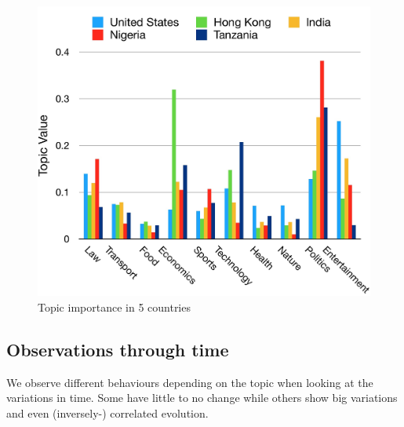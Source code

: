 \documentclass[11pt]{article}
\begin{document}
\begin{figure}[hbtp!]
    \centering
    \includegraphics[width=\linewidth]{images/5countries.jpg}
    \caption{Topic importance in 5 countries}
    \label{fig:5countries}
\end{figure}


\subsection{Observations through time}
We observe different behaviours depending on the topic when looking at the variations in time. Some have little to no change while others show big variations and even (inversely-) correlated evolution.
\end{document}
